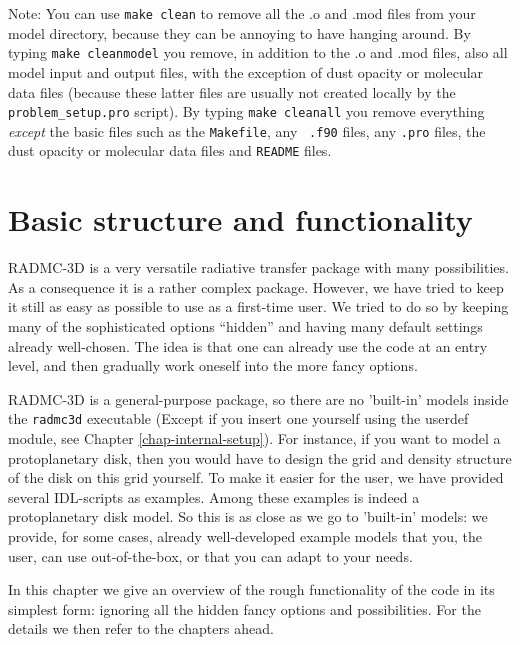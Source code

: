\documentclass{report}
\begin{document}
Note: You can use {\small\tt make clean} to remove all the .o and .mod files
from your model directory, because they can be annoying to have hanging
around. By typing {\small\tt make cleanmodel} you remove, in addition to the
.o and .mod files, also all model input and output files, with the exception
of dust opacity or molecular data files (because these latter files are
usually not created locally by the {\small\tt problem\_setup.pro}
script). By typing {\small\tt make cleanall} you remove everything {\em
  except} the basic files such as the {\small\tt Makefile}, any {\small\tt
  .f90} files, any {\small\tt .pro} files, the dust opacity or molecular
data files and {\small\tt README} files.




\chapter{Basic structure and functionality}
\label{chap-basic-struct-and-func}
%
RADMC-3D is a very versatile radiative transfer package with many
possibilities. As a consequence it is a rather complex package. However, we
have tried to keep it still as easy as possible to use as a first-time
user. We tried to do so by keeping many of the sophisticated options
``hidden'' and having many default settings already well-chosen. The idea is
that one can already use the code at an entry level, and then gradually work
oneself into the more fancy options.

RADMC-3D is a general-purpose package, so there are no 'built-in' models
inside the {\small\tt radmc3d} executable (Except if you insert one yourself
using the userdef module, see Chapter \ref{chap-internal-setup}).  For
instance, if you want to model a protoplanetary disk, then you would have to
design the grid and density structure of the disk on this grid yourself. To
make it easier for the user, we have provided several IDL-scripts as
examples. Among these examples is indeed a protoplanetary disk model. So
this is as close as we go to 'built-in' models: we provide, for some cases,
already well-developed example models that you, the user, can use
out-of-the-box, or that you can adapt to your needs.

In this chapter we give an overview of the rough functionality of the code
in its simplest form: ignoring all the hidden fancy options and
possibilities. For the details we then refer to the chapters ahead.
\end{document}
